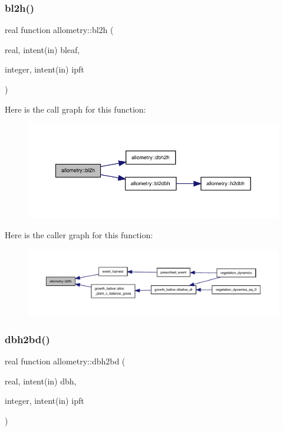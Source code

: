 \subsubsection{\texorpdfstring{bl2h()}{bl2h()}}
{\footnotesize\ttfamily real function allometry\+::bl2h (\begin{DoxyParamCaption}\item[{real, intent(in)}]{bleaf,  }\item[{integer, intent(in)}]{ipft }\end{DoxyParamCaption})}

Here is the call graph for this function\+:
\nopagebreak
\begin{figure}[H]
\begin{center}
\leavevmode
\includegraphics[width=350pt]{namespaceallometry_a59a1fc10140498dee62fce8a641da254_cgraph}
\end{center}
\end{figure}
Here is the caller graph for this function\+:
\nopagebreak
\begin{figure}[H]
\begin{center}
\leavevmode
\includegraphics[width=350pt]{namespaceallometry_a59a1fc10140498dee62fce8a641da254_icgraph}
\end{center}
\end{figure}
\mbox{\label{namespaceallometry_a76db2bc4aaa47db1e2656117ec476dba}} 
\subsubsection{\texorpdfstring{dbh2bd()}{dbh2bd()}}
{\footnotesize\ttfamily real function allometry\+::dbh2bd (\begin{DoxyParamCaption}\item[{real, intent(in)}]{dbh,  }\item[{integer, intent(in)}]{ipft }\end{DoxyParamCaption})}

